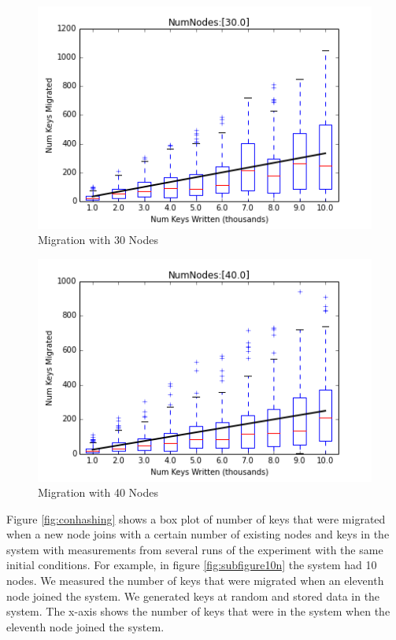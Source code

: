 \documentclass[10pt,twocolumn,letterpaper]{article}
\begin{document}
\begin{figure}[hbt]
 \centering
 \includegraphics[scale=0.50]{30.png}
 \caption{Migration with 30 Nodes}
\label{fig:subfigure30n}
\end{figure}

\begin{figure}[hbt]
 \centering
 \includegraphics[scale=0.50]{40.png}
 \caption{Migration with 40 Nodes}
\label{fig:subfigure40n}
\end{figure}

Figure \ref{fig:conhashing} shows a box plot of number of keys that were migrated when a new node joins with a certain number of existing nodes and keys in the system with measurements from several runs of the experiment with the same initial conditions. For example, in figure \ref{fig:subfigure10n} the system had 10 nodes. We measured the number of keys that were migrated when an eleventh node joined the system. We generated keys at random and stored data in the system. The x-axis shows the number of keys that were in the system when the eleventh node joined the system. 
\end{document}
